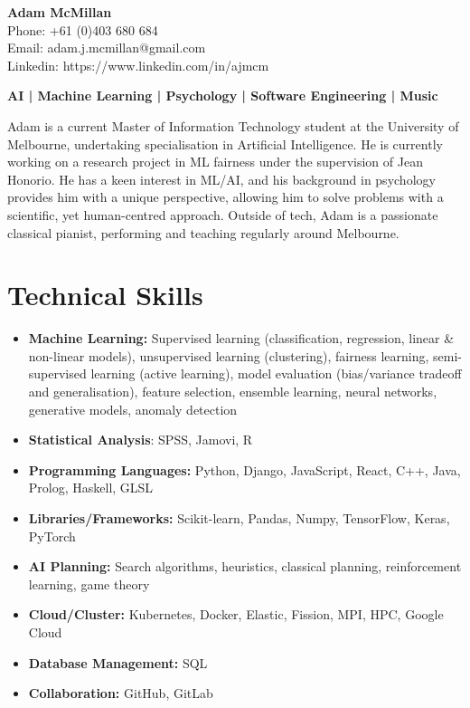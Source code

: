 \documentclass[a4paper,10pt]{article}
\begin{document}
\begin{center}
    \textbf{\LARGE Adam McMillan} \\
    \vspace{0.2cm}
    Phone: +61 (0)403 680 684 \\
    Email: adam.j.mcmillan@gmail.com\\
    Linkedin: https://www.linkedin.com/in/ajmcm
\end{center}

\begin{center}
    \textbf{\normalsize AI | Machine Learning | Psychology | Software Engineering | Music}\\
\end{center}

\noindent Adam is a current Master of Information Technology student at the University of Melbourne, undertaking specialisation in Artificial Intelligence. He is currently working on a research project in ML fairness under the supervision of Jean Honorio. He has a keen interest in ML/AI, and his background in psychology provides him with a unique perspective, allowing him to solve problems with a scientific, yet human-centred approach.  Outside of tech, Adam is a passionate classical pianist, performing and teaching regularly around Melbourne.

\section*{\Large Technical Skills}
\begin{itemize}
    \item \textbf{Machine Learning:} Supervised learning (classification, regression, linear \& non-linear models), unsupervised learning (clustering), fairness learning, semi-supervised learning (active learning), model evaluation (bias/variance tradeoff and generalisation), feature selection, ensemble learning, neural networks, generative models, anomaly detection
    \item \textbf{Statistical Analysis}: SPSS, Jamovi, R
    \item \textbf{Programming Languages:} Python, Django, JavaScript, React, C++, Java, Prolog, Haskell, GLSL
    \item \textbf{Libraries/Frameworks:} Scikit-learn, Pandas, Numpy, TensorFlow, Keras, PyTorch
    \item \textbf{AI Planning:} Search algorithms, heuristics, classical planning, reinforcement learning, game theory
    \item \textbf{Cloud/Cluster:} Kubernetes, Docker, Elastic, Fission, MPI, HPC, Google Cloud
    \item \textbf{Database Management:} SQL
    \item \textbf{Collaboration:} GitHub, GitLab

\end{itemize}
\end{document}
